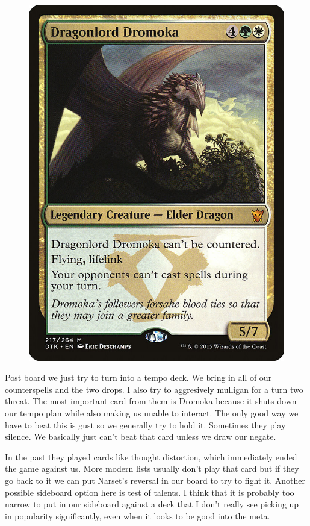 \documentclass[12pt]{article}
\begin{document}
\begin{figure}
    \includegraphics[width=0.9\linewidth]{Cards/dromoka.jpg}
\end{figure}

Post board we just try to turn into a tempo deck. We bring in all of our counterspells and the two drops. I also try to aggresively mulligan for a turn two threat. The most important card from them is Dromoka because it shuts down our tempo plan while also making us unable to interact. The only good way we have to beat this is gust so we generally try to hold it. Sometimes they play silence. We basically just can't beat that card unless we draw our negate.

In the past they played cards like thought distortion, which immediately ended the game against us. More modern lists usually don't play that card but if they go back to it we can put Narset's reversal in our board to try to fight it. Another possible sideboard option here is test of talents. I think that it is probably too narrow to put in our sideboard against a deck that I don't really see picking up in popularity significantly, even when it looks to be good into the meta.
\end{document}
